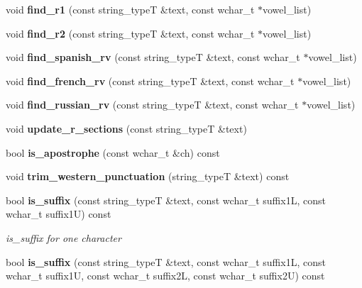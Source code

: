 \begin{DoxyCompactItemize}
\item 
void {\bfseries find\+\_\+r1} (const string\+\_\+typeT \&text, const wchar\+\_\+t $\ast$vowel\+\_\+list)\label{classstemming_1_1stem_a364b7a76f683d5244715638069a4fa93}

\item 
void {\bfseries find\+\_\+r2} (const string\+\_\+typeT \&text, const wchar\+\_\+t $\ast$vowel\+\_\+list)\label{classstemming_1_1stem_ab381c0d6a6291c2c21515e9398e83085}

\item 
void {\bfseries find\+\_\+spanish\+\_\+rv} (const string\+\_\+typeT \&text, const wchar\+\_\+t $\ast$vowel\+\_\+list)\label{classstemming_1_1stem_ae6cb258098ba91462d421977b1eed8e7}

\item 
void {\bfseries find\+\_\+french\+\_\+rv} (const string\+\_\+typeT \&text, const wchar\+\_\+t $\ast$vowel\+\_\+list)\label{classstemming_1_1stem_a9626e49b982eda0d8ec3bb861d864b42}

\item 
void {\bfseries find\+\_\+russian\+\_\+rv} (const string\+\_\+typeT \&text, const wchar\+\_\+t $\ast$vowel\+\_\+list)\label{classstemming_1_1stem_a53dcfe6b18fe5b5882474f222190ef1b}

\item 
void {\bfseries update\+\_\+r\+\_\+sections} (const string\+\_\+typeT \&text)\label{classstemming_1_1stem_a9dcc3d89844ecd5c81eabf80936a0209}

\item 
bool {\bf is\+\_\+apostrophe} (const wchar\+\_\+t \&ch) const 
\item 
void {\bfseries trim\+\_\+western\+\_\+punctuation} (string\+\_\+typeT \&text) const \label{classstemming_1_1stem_a36818a956dd34c388fa9942ed46e28b4}

\item 
bool {\bf is\+\_\+suffix} (const string\+\_\+typeT \&text, const wchar\+\_\+t suffix1L, const wchar\+\_\+t suffix1U) const \label{classstemming_1_1stem_ac318ddd46a716673edf3678c47d3035c}

\begin{DoxyCompactList}\small\item\em is\+\_\+suffix for one character \end{DoxyCompactList}\item 
bool {\bf is\+\_\+suffix} (const string\+\_\+typeT \&text, const wchar\+\_\+t suffix1L, const wchar\+\_\+t suffix1U, const wchar\+\_\+t suffix2L, const wchar\+\_\+t suffix2U) const \label{classstemming_1_1stem_aad4dff424a3ae8a82dcfe6adac7c9d30}


\end{DoxyCompactItemize}
